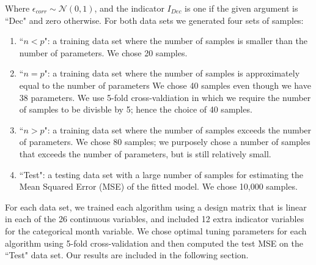 \documentclass[11pt]{article}
\begin{document}
Where $\epsilon_{corr} \sim \mathcal{N}(0,1)$, and the indicator $I_{Dec}$ is one if the given argument is ``Dec" and zero otherwise.  For both data sets we generated four sets of samples:
\begin{enumerate}
	\item ``$n<p$": a training data set where the number of samples is smaller than the number of parameters.  We chose 20 samples.  
	\item ``$n=p$": a training data set where the number of samples is approximately equal to the number of parameters  We chose 40 samples even though we have 38 parameters.  We use 5-fold cross-valdiation in which we require the number of samples to be divisble by 5; hence the choice of 40 samples.  
	\item ``$n>p$": a training data set where the number of samples exceeds the number of parameters.  We chose 80 samples; we purposely chose a number of samples that exceeds the number of parameters, but is still relatively small.  
	\item ``Test": a testing data set with a large number of samples for estimating the Mean Squared Error (MSE) of the fitted model.  We chose 10,000 samples.  
\end{enumerate}

For each data set, we trained each algorithm using a design matrix that is linear in each of the 26 continuous variables, and included 12 extra indicator variables for the categorical month variable.  We chose optimal tuning parameters for each algorithm using 5-fold cross-validation and then computed the test MSE on the ``Test" data set.  Our results are included in the following section.  
\end{document}
